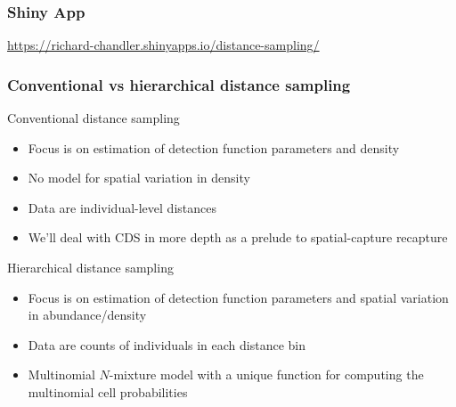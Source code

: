 \documentclass[color=usenames,dvipsnames]{beamer}\usepackage[]{graphicx}\usepackage[]{xcolor}
\begin{document}
\begin{frame}
  \frametitle{Shiny App}
    \centering
    \href{
      https://richard-chandler.shinyapps.io/distance-sampling/
    }{
      \Large
      \normalsize
      \color{blue}
      https://richard-chandler.shinyapps.io/distance-sampling/
    }
\end{frame}




\begin{frame}
  \frametitle{\large Conventional vs hierarchical distance sampling}
  \alert{Conventional} distance sampling
  \begin{itemize}
    \item Focus is on estimation of detection function parameters and density
    \item No model for spatial variation in density
    \item Data are individual-level distances
    \item We'll deal with CDS in more depth as a prelude to
      spatial-capture recapture
  \end{itemize}
  \pause
  \vfill
  \alert{Hierarchical} distance sampling
  \begin{itemize}
    \item Focus is on estimation of detection function parameters and
      spatial variation in abundance/density
    \item Data are counts of individuals in each distance bin
    \item Multinomial $N$-mixture model with a unique function for
      computing the multinomial cell probabilities 
  \end{itemize}
\end{frame}
\end{document}
